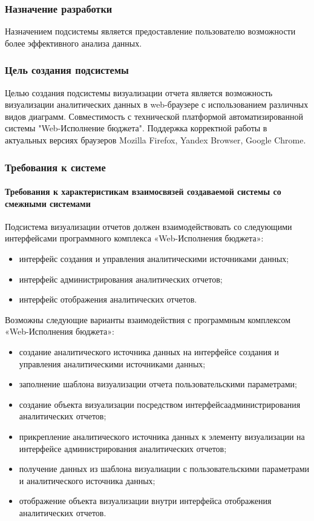 \documentclass[a4paper]{extarticle}
\begin{document}
\subsubsection{Назначение разработки}
Назначением подсистемы является предоставление пользователю возможности более эффективного анализа данных.

\subsubsection{Цель создания подсистемы}
Целью создания подсистемы визуализации отчета является возможность визуализации аналитических данных в web-браузере с использованием различных видов диаграмм. Совместимость с технической платформой автоматизированной системы "Web-Исполнение бюджета". Поддержка корректной работы в актуальных версиях браузеров Mozilla Firefox, Yandex Browser, Google Chrome.

\subsubsection{Требования к системе}

\paragraph{Требования к характеристикам взаимосвязей создаваемой системы со смежными системами}
Подсистема визуализации отчетов должен взаимодействовать со следующими интерфейсами программного комплекса «Web-Исполнения бюджета»:\par
\begin{itemize}
  \item интерфейс создания и управления аналитическими источниками данных;
  \item интерфейс администрирования аналитических отчетов;
  \item интерфейс отображения аналитических отчетов.
\end{itemize}\par
Возможны следующие варианты взаимодействия с программным комплексом «Web-Исполнения бюджета»:
\begin{itemize}
  \item создание аналитического источника данных на интерфейсе создания и управления аналитическими источниками данных;
  \item заполнение шаблона визуализации отчета пользовательскими параметрами;
  \item создание объекта визуализации посредством интерфейса\newline администрирования аналитических отчетов;
  \item прикрепление аналитического источника данных к элементу визуализации на интерфейсе администрирования аналитических отчетов;
  \item получение данных из шаблона визуалиации с пользовательскими параметрами и аналитического источника данных;
  \item отображение объекта визуализации внутри интерфейса отображения аналитических отчетов.
\end{itemize}
\end{document}
